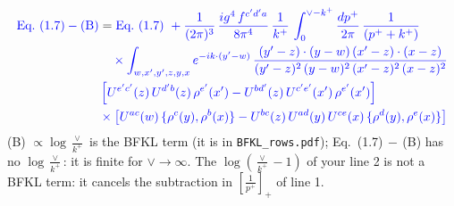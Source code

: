 \documentclass[9pt]{article}
\numberwithin{equation}{section}
\begin{document}
\begin{align*}
{\color{blue}\text{Eq.~(1.7)} - \text{(B)}} &= \color{blue}\text{Eq.~(1.7)}\ +\frac{1}{(2\pi)^{3}}\, \frac{ig^{4}\,f^{c'd'a}}{8\pi^{4}}\, \frac{1}{k^{+}}\,\int_{0}^{\vee-k^{+}}\frac{dp^{+}}{2\pi}\,\frac{1}{(p^{+}+k^{+})}\\ & \color{blue} \quad\times\int_{w,x',y',z,y,x} e^{-ik\cdot (y'-w)}\,\frac{(y'-z)\cdot (y-w)\,(x'-z)\cdot (x-z)}{(y'-z)^{2}\,(y-w)^{2}\,(x'-z)^{2}\,(x-z)^{2}}\notag \\
& \color{blue}  \left[U^{e'c'}(z)\,U^{d'b}(z)\,\rho^{e'}(x')-U^{bd'}(z)\,U^{c'e'}(x')\,\rho^{e'}(x')\right]\notag \\
& \color{blue}  \times\left[U^{ac}(w)\, \{\rho^{c}(y),\rho^{b}(x)\}-U^{bc}(z)\,U^{ad}(y)\,U^{ce}(x)\,\{\rho^{d}(y),\rho^{e}(x)\}\right]
\end{align*}
{\color{blue}\noindent (B) $\propto\log\frac{\vee}{k^+}$ is the BFKL term (it is in \texttt{BFKL\_rows.pdf}); Eq.~(1.7)$\,-\,$(B) has no $\log\frac{\vee}{k^+}$: it is finite for $\vee\to\infty$. The $\log(\frac{\vee}{k^+}-1)$ of your line 2 is not a BFKL term: it cancels the subtraction in $\left[\frac{1}{p^+}\right]_+$ of line 1.}
\end{document}
